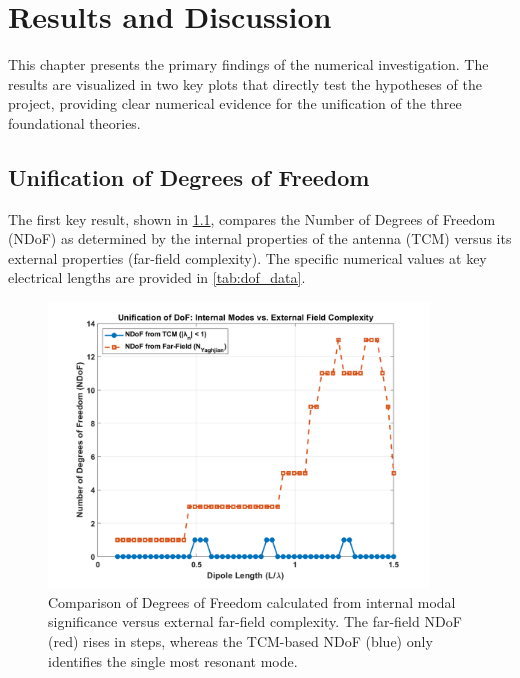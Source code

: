 \documentclass[11pt, a4paper]{report}
\begin{document}
\newpage

\chapter{Results and Discussion} \label{ch:results}

This chapter presents the primary findings of the numerical investigation. The results are visualized in two key plots that directly test the hypotheses of the project, providing clear numerical evidence for the unification of the three foundational theories.

\section{Unification of Degrees of Freedom}
The first key result, shown in \cref{fig:dof_unification}, compares the Number of Degrees of Freedom (NDoF) as determined by the internal properties of the antenna (TCM) versus its external properties (far-field complexity). The specific numerical values at key electrical lengths are provided in \cref{tab:dof_data}.

\begin{figure}[H]
    \centering
    \includegraphics[width=0.9\textwidth]{Fig_Phase3_DoF_Unification.png}
    \caption{Comparison of Degrees of Freedom calculated from internal modal significance versus external far-field complexity. The far-field NDoF (red) rises in steps, whereas the TCM-based NDoF (blue) only identifies the single most resonant mode.}
    \label{fig:dof_unification}
\end{figure}
\end{document}
